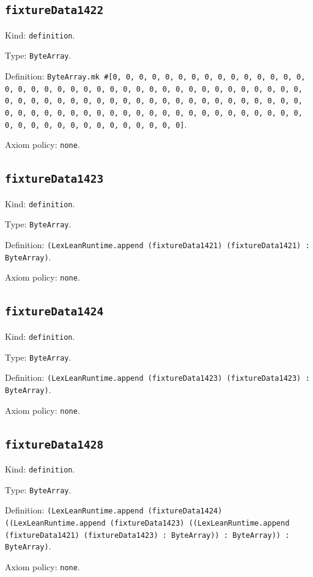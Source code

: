 \documentclass[11pt]{article}
\begin{document}
\subsection*{\texttt{fixtureData1422}}
\noindent Kind: \texttt{definition}.\par
\noindent Type: \texttt{ByteArray}.\par
\noindent Definition: \texttt{ByteArray.mk \#[0, 0, 0, 0, 0, 0, 0, 0, 0, 0, 0, 0, 0, 0, 0, 0, 0, 0, 0, 0, 0, 0, 0, 0, 0, 0, 0, 0, 0, 0, 0, 0, 0, 0, 0, 0, 0, 0, 0, 0, 0, 0, 0, 0, 0, 0, 0, 0, 0, 0, 0, 0, 0, 0, 0, 0, 0, 0, 0, 0, 0, 0, 0, 0, 0, 0, 0, 0, 0, 0, 0, 0, 0, 0, 0, 0, 0, 0, 0, 0, 0, 0, 0, 0, 0, 0, 0, 0, 0, 0, 0, 0, 0, 0, 0, 0, 0, 0]}.\par
\noindent Axiom policy: \texttt{none}.\par
\subsection*{\texttt{fixtureData1423}}
\noindent Kind: \texttt{definition}.\par
\noindent Type: \texttt{ByteArray}.\par
\noindent Definition: \texttt{(LexLeanRuntime.append (fixtureData1421) (fixtureData1421) : ByteArray)}.\par
\noindent Axiom policy: \texttt{none}.\par
\subsection*{\texttt{fixtureData1424}}
\noindent Kind: \texttt{definition}.\par
\noindent Type: \texttt{ByteArray}.\par
\noindent Definition: \texttt{(LexLeanRuntime.append (fixtureData1423) (fixtureData1423) : ByteArray)}.\par
\noindent Axiom policy: \texttt{none}.\par
\subsection*{\texttt{fixtureData1428}}
\noindent Kind: \texttt{definition}.\par
\noindent Type: \texttt{ByteArray}.\par
\noindent Definition: \texttt{(LexLeanRuntime.append (fixtureData1424) ((LexLeanRuntime.append (fixtureData1423) ((LexLeanRuntime.append (fixtureData1421) (fixtureData1423) : ByteArray)) : ByteArray)) : ByteArray)}.\par
\noindent Axiom policy: \texttt{none}.\par
\end{document}
